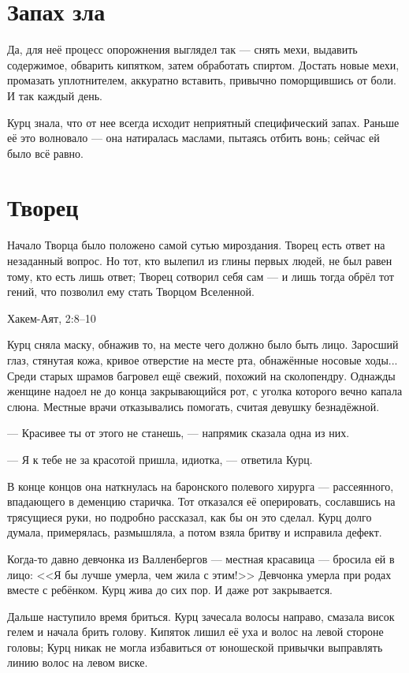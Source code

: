 \documentclass[a4paper,10pt,fleqn]{book}\usepackage{polyglossia}\setdefaultlanguage{english}\setotherlanguage{russian}\defaultfontfeatures{Ligatures=TeX,Mapping=tex-text}\usepackage{xcolor}\definecolor{lightgray}{HTML}{bbbbbb}\color{lightgray}\newcommand{\ml}[3]{\textcolor{black}{#3}}
\begin{document}
\section{Запах зла}

Да, для неё процесс опорожнения выглядел так --- снять мехи, выдавить содержимое, обварить кипятком, затем обработать спиртом.
Достать новые мехи, промазать уплотнителем, аккуратно вставить, привычно поморщившись от боли.
И так каждый день.

Курц знала, что от нее всегда исходит неприятный специфический запах.
Раньше её это волновало --- она натиралась маслами, пытаясь отбить вонь;
сейчас ей было всё равно.

\section{Творец}

\epigraph{Начало Творца было положено самой сутью мироздания.
Творец есть ответ на незаданный вопрос.
Но тот, кто вылепил из глины первых людей, не был равен тому, кто есть лишь ответ;
Творец сотворил себя сам --- и лишь тогда обрёл тот гений, что позволил ему стать Творцом Вселенной.}
{Хакем-Аят, 2:8--10}

Курц сняла маску, обнажив то, на месте чего должно было быть лицо.
Заросший глаз, стянутая кожа, кривое отверстие на месте рта, обнажённые носовые ходы...
Среди старых шрамов багровел ещё свежий, похожий на сколопендру.
Однажды женщине надоел не до конца закрывающийся рот, с уголка которого вечно капала слюна.
Местные врачи отказывались помогать, считая девушку безнадёжной.

--- Красивее ты от этого не станешь, --- напрямик сказала одна из них.

--- Я к тебе не за красотой пришла, идиотка, --- ответила Курц.

В конце концов она наткнулась на баронского полевого хирурга --- рассеянного, впадающего в деменцию старичка.
Тот отказался её оперировать, сославшись на трясущиеся руки, но подробно рассказал, как бы он это сделал.
Курц долго думала, примерялась, размышляла, а потом взяла бритву и исправила дефект.

Когда-то давно девчонка из Валленбергов --- местная красавица --- бросила ей в лицо:
<<Я бы лучше умерла, чем жила с этим!>>
Девчонка умерла при родах вместе с ребёнком.
Курц жива до сих пор.
И даже рот закрывается.

Дальше наступило время бриться.
Курц зачесала волосы направо, смазала висок гелем и начала брить голову.
Кипяток лишил её уха и волос на левой стороне головы;
Курц никак не могла избавиться от юношеской привычки выправлять линию волос на левом виске.
\end{document}
